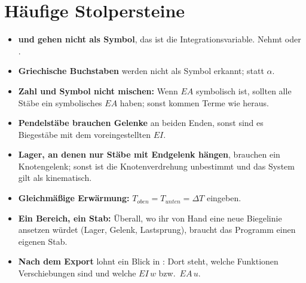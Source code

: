 \section{Häufige Stolpersteine}

\begin{itemize}
  \item \textbf{ und  gehen nicht als Symbol}, das ist die Integrationsvariable.
        Nehmt  oder .
  \item \textbf{Griechische Buchstaben} werden nicht als Symbol erkannt;  statt $\alpha$.
  \item \textbf{Zahl und Symbol nicht mischen:} Wenn $EA$ symbolisch ist, sollten alle Stäbe ein
        symbolisches $EA$ haben; sonst kommen Terme wie  heraus.
  \item \textbf{Pendelstäbe brauchen Gelenke} an beiden Enden, sonst sind es Biegestäbe mit dem
        voreingestellten $EI$.
  \item \textbf{Lager, an denen nur Stäbe mit Endgelenk hängen}, brauchen ein Knotengelenk; sonst
        ist die Knotenverdrehung unbestimmt und das System gilt als kinematisch.
  \item \textbf{Gleichmäßige Erwärmung:} $T_{oben} = T_{unten} = \Delta T$ eingeben.
  \item \textbf{Ein Bereich, ein Stab:} Überall, wo ihr von Hand eine neue Biegelinie ansetzen
        würdet (Lager, Gelenk, Lastsprung), braucht das Programm einen eigenen Stab.
  \item \textbf{Nach dem Export} lohnt ein Blick in : Dort steht, welche Funktionen
        Verschiebungen sind und welche $EI\,w$ bzw.\ $EA\,u$.
\end{itemize}



